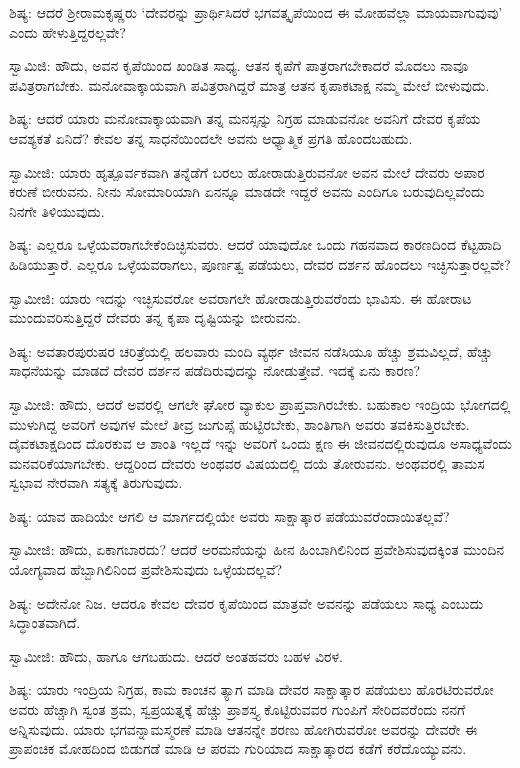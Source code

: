 ಶಿಷ್ಯ: ಆದರೆ ಶ‍್ರೀರಾಮಕೃಷ್ಣರು ‘ದೇವರನ್ನು ಪ್ರಾರ್ಥಿಸಿದರೆ ಭಗವತ್ಕೃಪೆಯಿಂದ ಈ ಮೋಹವೆಲ್ಲಾ ಮಾಯವಾಗುವುವು’ ಎಂದು ಹೇಳುತ್ತಿದ್ದರಲ್ಲವೇ?

ಸ್ವಾಮಿಜಿ: ಹೌದು, ಅವನ ಕೃಪೆಯಿಂದ ಖಂಡಿತ ಸಾಧ್ಯ. ಆತನ ಕೃಪೆಗೆ ಪಾತ್ರರಾಗಬೇಕಾದರೆ ಮೊದಲು ನಾವೂ ಪವಿತ್ರರಾಗಬೇಕು. ಮನೋವಾಕ್ಕಾಯವಾಗಿ ಪವಿತ್ರರಾಗಿದ್ದರೆ ಮಾತ್ರ ಆತನ ಕೃಪಾಕಟಾಕ್ಷ ನಮ್ಮ ಮೇಲೆ ಬೀಳುವುದು.

ಶಿಷ್ಯ: ಆದರೆ ಯಾರು ಮನೋವಾಕ್ಕಾಯವಾಗಿ ತನ್ನ ಮನಸ್ಸನ್ನು ನಿಗ್ರಹ ಮಾಡುವನೋ ಅವನಿಗೆ ದೇವರ ಕೃಪೆಯ ಆವಶ್ಯಕತೆ ಏನಿದೆ? ಕೇವಲ ತನ್ನ ಸಾಧನೆಯಿಂದಲೇ ಅವನು ಆಧ್ಯಾತ್ಮಿಕ ಪ್ರಗತಿ ಹೊಂದಬಹುದು.

ಸ್ವಾಮೀಜಿ: ಯಾರು ಹೃತ್ಪೂರ್ವಕವಾಗಿ ತನ್ನೆಡೆಗೆ ಬರಲು ಹೋರಾಡುತ್ತಿರುವನೋ ಅವನ ಮೇಲೆ ದೇವರು ಅಪಾರ ಕರುಣೆ ಬೀರುವನು. ನೀನು ಸೋಮಾರಿಯಾಗಿ ಏನನ್ನೂ ಮಾಡದೇ ಇದ್ದರೆ ಅವನು ಎಂದಿಗೂ ಬರುವುದಿಲ್ಲವೆಂದು ನಿನಗೇ ತಿಳಿಯುವುದು.

ಶಿಷ್ಯ: ಎಲ್ಲರೂ ಒಳ್ಳೆಯವರಾಗಬೇಕೆಂದಿಚ್ಛಿಸುವರು. ಆದರೆ ಯಾವುದೋ ಒಂದು ಗಹನವಾದ ಕಾರಣದಿಂದ ಕೆಟ್ಟಹಾದಿ ಹಿಡಿಯುತ್ತಾರೆ. ಎಲ್ಲರೂ ಒಳ್ಳೆಯವರಾಗಲು, ಪೂರ್ಣತ್ವ ಪಡೆಯಲು, ದೇವರ ದರ್ಶನ ಹೊಂದಲು ಇಚ್ಛಿಸುತ್ತಾರಲ್ಲವೇ?

ಸ್ವಾಮೀಜಿ: ಯಾರು ಇದನ್ನು ಇಚ್ಛಿಸುವರೋ ಅವರಾಗಲೇ ಹೋರಾಡುತ್ತಿರುವರೆಂದು ಭಾವಿಸು. ಈ ಹೋರಾಟ ಮುಂದುವರಿಸುತ್ತಿದ್ದರೆ ದೇವರು ತನ್ನ ಕೃಪಾ ದೃಷ್ಟಿಯನ್ನು ಬೀರುವನು.

ಶಿಷ್ಯ: ಅವತಾರಪುರುಷರ ಚರಿತ್ರೆಯಲ್ಲಿ ಹಲವಾರು ಮಂದಿ ವ್ಯರ್ಥ ಜೀವನ ನಡೆಸಿಯೂ ಹೆಚ್ಚು ಶ್ರಮವಿಲ್ಲದೆ, ಹೆಚ್ಚು ಸಾಧನೆಯನ್ನು ಮಾಡದೆ ದೇವರ ದರ್ಶನ ಪಡೆದಿರುವುದನ್ನು ನೋಡುತ್ತೇವೆ. ಇದಕ್ಕೆ ಏನು ಕಾರಣ?

ಸ್ವಾಮೀಜಿ: ಹೌದು, ಆದರೆ ಅವರಲ್ಲಿ ಆಗಲೇ ಘೋರ ವ್ಯಾಕುಲ ಪ್ರಾಪ್ತವಾಗಿರಬೇಕು. ಬಹುಕಾಲ ಇಂದ್ರಿಯ ಭೋಗದಲ್ಲಿ ಮುಳುಗಿದ್ದ ಅವರಿಗೆ ಅವುಗಳ ಮೇಲೆ ತೀವ್ರ ಜುಗುಪ್ಸೆ ಹುಟ್ಟಿರಬೇಕು, ಶಾಂತಿಗಾಗಿ ಅವರು ತವಕಿಸುತ್ತಿರಬೇಕು. ದೈವಕಟಾಕ್ಷದಿಂದ ದೊರಕುವ ಆ ಶಾಂತಿ ಇಲ್ಲದೆ ಇನ್ನು ಅವರಿಗೆ ಒಂದು ಕ್ಷಣ ಈ ಜೀವನದಲ್ಲಿರುವುದೂ ಅಸಾಧ್ಯವೆಂದು ಮನವರಿಕೆಯಾಗಬೇಕು. ಆದ್ದರಿಂದ ದೇವರು ಅಂಥವರ ವಿಷಯದಲ್ಲಿ ದಯೆ ತೋರುವನು. ಅಂಥವರಲ್ಲಿ ತಾಮಸ ಸ್ವಭಾವ ನೇರವಾಗಿ ಸತ್ಯಕ್ಕೆ ತಿರುಗುವುದು.

ಶಿಷ್ಯ: ಯಾವ ಹಾದಿಯೇ ಆಗಲಿ ಆ ಮಾರ್ಗದಲ್ಲಿಯೇ ಅವರು ಸಾಕ್ಷಾತ್ಕಾರ ಪಡೆಯುವರೆಂದಾಯಿತಲ್ಲವೆ?

ಸ್ವಾಮೀಜಿ: ಹೌದು, ಏಕಾಗಬಾರದು? ಆದರೆ ಅರಮನೆಯನ್ನು ಹೀನ ಹಿಂಬಾಗಿಲಿನಿಂದ ಪ್ರವೇಶಿಸುವುದಕ್ಕಿಂತ ಮುಂದಿನ ಯೋಗ್ಯವಾದ ಹೆಬ್ಬಾಗಿಲಿನಿಂದ ಪ್ರವೇಶಿಸುವುದು ಒಳ್ಳೆಯದಲ್ಲವೆ?

ಶಿಷ್ಯ: ಅದೇನೋ ನಿಜ. ಆದರೂ ಕೇವಲ ದೇವರ ಕೃಪೆಯಿಂದ ಮಾತ್ರವೇ ಅವನನ್ನು ಪಡೆಯಲು ಸಾಧ್ಯ ಎಂಬುದು ಸಿದ್ಧಾಂತವಾಗಿದೆ.

ಸ್ವಾಮೀಜಿ: ಹೌದು, ಹಾಗೂ ಆಗಬಹುದು. ಆದರೆ ಅಂತಹವರು ಬಹಳ ವಿರಳ.

ಶಿಷ್ಯ: ಯಾರು ಇಂದ್ರಿಯ ನಿಗ್ರಹ, ಕಾಮ ಕಾಂಚನ ತ್ಯಾಗ ಮಾಡಿ ದೇವರ ಸಾಕ್ಷಾತ್ಕಾರ ಪಡೆಯಲು ಹೊರಟಿರುವರೋ ಅವರು ಹೆಚ್ಚಾಗಿ ಸ್ವಂತ ಶ್ರಮ, ಸ್ವಪ್ರಯತ್ನಕ್ಕೆ ಹೆಚ್ಚು ಪ್ರಾಶಸ್ತ್ಯ ಕೊಟ್ಟಿರುವವರ ಗುಂಪಿಗೆ ಸೇರಿದವರೆಂದು ನನಗೆ ಅನ್ನಿಸುವುದು. ಯಾರು ಭಗವನ್ನಾಮಸ್ಮರಣೆ ಮಾಡಿ ಆತನನ್ನೇ ಶರಣು ಹೋಗಿರುವರೋ ಅವರನ್ನು ದೇವರೇ ಈ ಪ್ರಾಪಂಚಿಕ ಮೋಹದಿಂದ ಬಿಡುಗಡೆ ಮಾಡಿ ಆ ಪರಮ ಗುರಿಯಾದ ಸಾಕ್ಷಾತ್ಕಾರದ ಕಡೆಗೆ ಕರೆದೊಯ್ಯುವನು.

